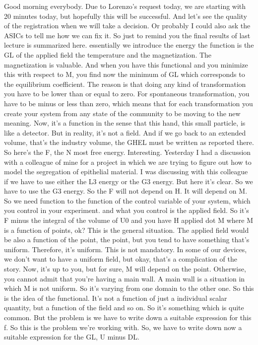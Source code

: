 Good morning everybody. Due to Lorenzo's request today, we are starting with 20 minutes today, but hopefully this will be successful. And let's see the quality of the registration when we will take a decision. Or probably I could also ask the ASICs to tell me how we can fix it. So just to remind you the final results of last lecture is summarized here. essentially we introduce the energy the function is the GL of the applied field the temperature and the magnetization. The magnetization is valuable. And when you have this functional and you minimize this with respect to M, you find now the minimum of GL which corresponds to the equilibrium coefficient. The reason is that doing any kind of transformation you have to be lower than or equal to zero. For spontaneous transformation, you have to be minus or less than zero, which means that for each transformation you create your system from any state of the community to be moving to the new meaning. Now, it's a function in the sense that this hand, this small particle, is like a detector. But in reality, it's not a field. And if we go back to an extended volume, that's the industry volume, the GHEL must be written as reported there. So here's the F, the N most free energy. Interesting. Yesterday I had a discussion with a colleague of mine for a project in which we are trying to figure out how to model the segregation of epithelial material. I was discussing with this colleague if we have to use either the L3 energy or the G3 energy. But here it's clear. So we have to use the G3 energy. So the F will not depend on H. It will depend on M. So we need function to the function of the control variable of your system, which you control in your experiment. and what you control is the applied field. So it's F minus the integral of the volume of U0 and you have H applied dot M where M is a function of points, ok? This is the general situation. The applied field would be also a function of the point, the point, but you tend to have something that's uniform. Therefore, it's uniform. This is not mandatory. In some of our devices, we don't want to have a uniform field, but okay, that's a complication of the story. Now, it's up to you, but for sure, M will depend on the point. Otherwise, you cannot admit that you're having a main wall. A main wall is a situation in which M is not uniform. So it's varying from one domain to the other one. So this is the idea of the functional. It's not a function of just a individual scalar quantity, but a function of the field and so on. So it's something which is quite common. But the problem is we have to write down a suitable expression for this f. So this is the problem we're working with. So, we have to write down now a suitable expression for the GL, U minus DL.
